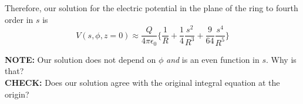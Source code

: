 \documentclass[a4paper, 11pt]{article}
\newenvironment{solution}{%
	\begin{list}{}{%
			\setlength{\topsep}{0pt}%
			\setlength{\leftmargin}{0.5cm}%
			\setlength{\rightmargin}{0.5cm}%
			\setlength{\listparindent}{\parindent}%
			\setlength{\itemindent}{\parindent}%
			\setlength{\parsep}{\parskip}%
		}%
		\item[]}{\end{list}}
\begin{document}
\begin{solution}
  
  \noindent Therefore, our solution for the electric potential in the plane of the ring to
  fourth order in $s$ is
  \begin{equation}
    V(s,\phi,z=0) \approx \frac{Q}{4\pi\epsilon_0}\Bigg\{  \frac{1}{R} + \frac{1}{4} \frac{s^2}{R^3}+\frac{9}{64} \frac{s^4}{R^5} \Bigg\} 
  \end{equation}
  

  \vspace{2em}
  
  \noindent\textbf{NOTE:} Our solution does not depend on $\phi$ \textit{and}  is an even function in $s$. Why is that? \\

  \noindent\textbf{CHECK:} Does our solution agree with the original integral equation at
  the origin? 
  
\end{solution}
\end{document}
